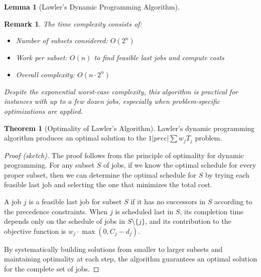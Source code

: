 \documentclass{article}
\newtheorem{remark}{Remark}
\theoremstyle{definition}
\newtheorem{theorem}{Theorem}
\newtheorem{lemma}{Lemma}
\begin{document}
\begin{lemma}[Lawler's Dynamic Programming Algorithm]
\begin{remark}
The time complexity consists of:
\begin{itemize}
    \item Number of subsets considered: $O(2^n)$
    \item Work per subset: $O(n)$ to find feasible last jobs and compute costs
    \item Overall complexity: $O(n \cdot 2^n)$
\end{itemize}

Despite the exponential worst-case complexity, this algorithm is practical for instances with up to a few dozen jobs, especially when problem-specific optimizations are applied.
\end{remark}
\end{lemma}

\begin{theorem}[Optimality of Lawler's Algorithm]
Lawler's dynamic programming algorithm produces an optimal solution to the $1|prec|\sum w_jT_j$ problem.
\begin{proof}[Proof (sketch)]
The proof follows from the principle of optimality for dynamic programming. For any subset $S$ of jobs, if we know the optimal schedule for every proper subset, then we can determine the optimal schedule for $S$ by trying each feasible last job and selecting the one that minimizes the total cost.

A job $j$ is a feasible last job for subset $S$ if it has no successors in $S$ according to the precedence constraints. When $j$ is scheduled last in $S$, its completion time depends only on the schedule of jobs in $S \setminus \{j\}$, and its contribution to the objective function is $w_j \cdot \max(0, C_j - d_j)$.

By systematically building solutions from smaller to larger subsets and maintaining optimality at each step, the algorithm guarantees an optimal solution for the complete set of jobs.
\end{proof}
\end{theorem}
\end{document}

